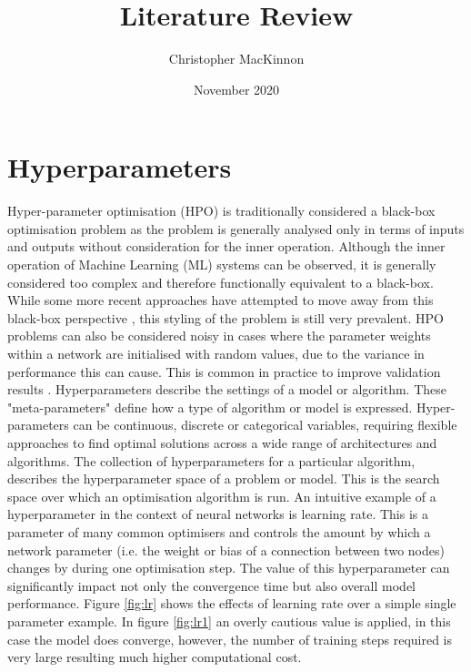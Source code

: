 \documentclass{article}
\title{Literature Review}
\author{Christopher MacKinnon }
\date{November 2020}
\begin{document}
\maketitle

	\section{Hyperparameters}

Hyper-parameter optimisation (HPO) is traditionally considered a black-box optimisation problem as the problem is generally analysed only in terms of inputs and outputs without consideration for the inner operation. Although the inner operation of Machine Learning (ML) systems can be observed, it is generally considered too complex and therefore functionally equivalent to a black-box. While some more recent approaches have attempted to move away from this black-box perspective \cite{NAS-RL,darts}, this styling of the problem is still very prevalent. HPO problems can also be considered noisy in cases where the parameter weights within a network are initialised with random values, due to the variance in performance this can cause. This is common in practice to improve validation results \cite{reproduce}.
Hyperparameters describe the settings of a model or algorithm. 
These "meta-parameters" define how a type of algorithm or model is expressed.
Hyper-parameters can be continuous, discrete or categorical variables, requiring flexible approaches to find optimal solutions across a wide range of architectures and algorithms.
The collection of hyperparameters for a particular algorithm, describes the hyperparameter space of a problem or model.
This is the search space over which an optimisation algorithm is run.
An intuitive example of a hyperparameter in the context of neural networks is learning rate. 
This is a parameter of many common optimisers and controls the amount by which a network parameter (i.e. the weight or bias of a connection between two nodes) changes by during one optimisation step. 
The value of this hyperparameter can significantly impact not only the convergence time but also overall model performance.
Figure \ref{fig:lr} shows the effects of learning rate over a simple single parameter example. 
In figure \ref{fig:lr1} an overly cautious value is applied, in this case the model does converge, however, the number of training steps required is very large resulting much higher computational cost.
\end{document}
